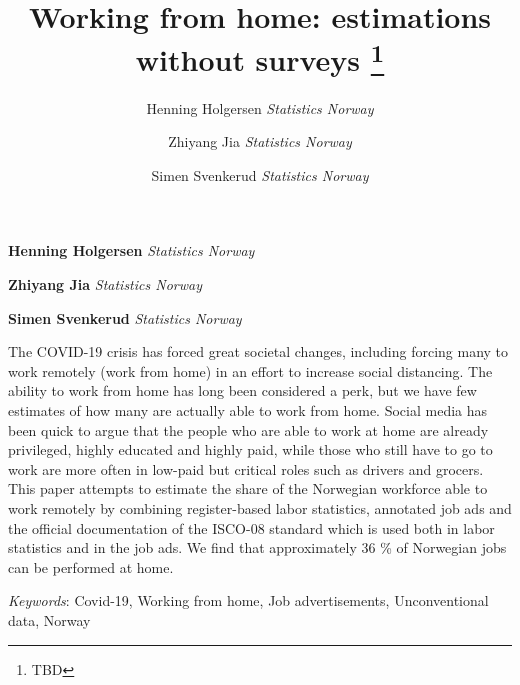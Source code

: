 \documentclass[11pt,]{article}
\title{Working from home: estimations without surveys \thanks{TBD}  }
\author{\Large Henning Holgersen\vspace{0.05in} \newline\normalsize\emph{Statistics Norway}   \and \Large Zhiyang Jia\vspace{0.05in} \newline\normalsize\emph{Statistics Norway}   \and \Large Simen Svenkerud\vspace{0.05in} \newline\normalsize\emph{Statistics Norway}  }
\date{}
\newcommand*{\authorfont}{\fontfamily{phv}\selectfont}
\renewenvironment{abstract}
 {{%
    \setlength{\leftmargin}{0mm}
    \setlength{\rightmargin}{\leftmargin}%
  }%
  \relax}
 {\endlist}
\begin{document}
	
%

{%
\setlength{\parindent}{0pt}
\thispagestyle{plain}
{\fontsize{18}{20}\selectfont\raggedright 
\maketitle  %

}

{
   \vskip 13.5pt\relax \normalsize\fontsize{11}{12} 
\textbf{\authorfont Henning Holgersen} \hskip 15pt \emph{\small Statistics Norway}   \par \textbf{\authorfont Zhiyang Jia} \hskip 15pt \emph{\small Statistics Norway}   \par \textbf{\authorfont Simen Svenkerud} \hskip 15pt \emph{\small Statistics Norway}   

}

}








\begin{abstract}

    \hbox{\vrule height .2pt width 39.14pc}

    \vskip 8.5pt %

\noindent The COVID-19 crisis has forced great societal changes, including forcing
many to work remotely (work from home) in an effort to increase social
distancing. The ability to work from home has long been considered a
perk, but we have few estimates of how many are actually able to work
from home. Social media has been quick to argue that the people who are
able to work at home are already privileged, highly educated and highly
paid, while those who still have to go to work are more often in
low-paid but critical roles such as drivers and grocers. This paper
attempts to estimate the share of the Norwegian workforce able to work
remotely by combining register-based labor statistics, annotated job ads
and the official documentation of the ISCO-08 standard which is used
both in labor statistics and in the job ads. We find that approximately
36 \% of Norwegian jobs can be performed at home.


\vskip 8.5pt \noindent \emph{Keywords}: Covid-19, Working from home, Job advertisements, Unconventional data,
Norway \par

    \hbox{\vrule height .2pt width 39.14pc}



\end{abstract}
\end{document}
